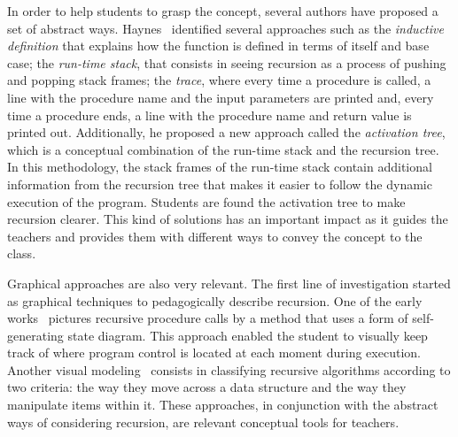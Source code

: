 In order to help students to grasp the concept, several authors have
proposed a set of abstract ways. Haynes~\cite{Haynes:1995} identified
several approaches such as the \emph{inductive definition} that
explains how the function is defined in terms of itself and base case;
the \emph{run\hyp{}time stack}, that consists in seeing recursion as a
process of pushing and popping stack frames; the \emph{trace}, where
every time a procedure is called, a line with the procedure name and
the input parameters are printed and, every time a procedure ends, a
line with the procedure name and return value is printed out.
Additionally, he proposed a new approach called the \emph{activation
  tree}, which is a conceptual combination of the run\hyp{}time stack
and the recursion tree. In this methodology, the stack frames of the
run\hyp{}time stack contain additional information from the recursion
tree that makes it easier to follow the dynamic execution of the
program. Students are found the activation tree to make recursion
clearer. This kind of solutions has an important impact as it guides
the teachers and provides them with different ways to convey the
concept to the class.

Graphical approaches are also very relevant. The first line of
investigation started as graphical techniques to pedagogically
describe recursion. One of the early works~\cite{Jackson:1976}
pictures recursive procedure calls by a method that uses a form of
self\hyp{}generating state diagram. This approach enabled the student
to visually keep track of where program control is located at each
moment during execution. Another visual
modeling~\cite{SternNaish:2002b} consists in classifying recursive
algorithms according to two criteria: the way they move across a data
structure and the way they manipulate items within it. These
approaches, in conjunction with the abstract ways of considering
recursion, are relevant conceptual tools for teachers.


